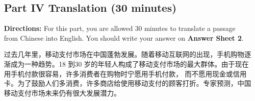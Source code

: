 \documentclass[UTF8,11pt]{ctexart}
\begin{document}
\subsection*{\textbf{Part} IV \textbf{Translation} \textbf{(30 minutes)}}


\textbf{Directions:} For this part, you are allowed 30 minutes to translate a passage from Chinese into English. You should write your answer on\textbf{ Answer Sheet 2}.


过去几年里，移动支付市场在中国蓬勃发展。随着移动互联网的出现，手机购物逐渐成为一种趋势。18 到30 岁的年轻人构成了移动支付市场的最大群体。由于现在用手机付款很容易，许多消费者在购物时宁愿用手机付款， 而不愿用现金或信用卡。为了鼓励人们多消费，许多商店给使用移动支付的顾客打折。专家预测，中国移动支付市场未来仍有很大发展潜力。
\end{document}
